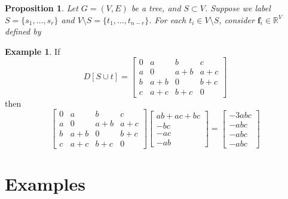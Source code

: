 \documentclass{amsart}
\newtheorem{prop}[thm]{Proposition}
\theoremstyle{definition}
\newtheorem{eg}[thm]{Example}
\newcommand{\RR}{\mathbb{R}}
\begin{document}
\begin{prop}
Let $G = (V,E)$ be a tree, and $S \subset V$.
Suppose we label $S = \{s_1, \ldots, s_r\}$
and $V \setminus S = \{t_1, \ldots, t_{n-r}\}$.
For each $t_i \in V\setminus S$,
consider
$\mathbf{f}_i  \in \RR^V$
defined by
\end{prop}

\begin{eg}
If 
$$
D[S \cup t] = \begin{bmatrix}
0 & a & b & c \\
a & 0 & a + b & a + c \\
b & a + b & 0 & b + c \\
c & a + c & b + c & 0
\end{bmatrix}
$$
then
$$
 \begin{bmatrix}
0 & a & b & c \\
a & 0 & a + b & a + c \\
b & a + b & 0 & b + c \\
c & a + c & b + c & 0
\end{bmatrix}
\begin{bmatrix}
ab + ac + bc \\ -bc \\ -ac \\ -ab 
\end{bmatrix}
= \begin{bmatrix}
-3abc \\ -abc \\ -abc \\ -abc
\end{bmatrix}
$$
\end{eg}



\section{Examples}
\end{document}
